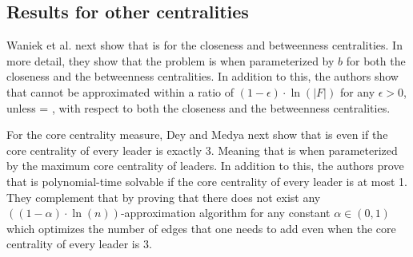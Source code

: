 \subsection{Results for other centralities}

Waniek et al. next show that \HL is \NPc for the closeness \cite{Waniek2017} and betweenness \cite{Waniek2021full} centralities.
In more detail, they show that the problem is \Wh when parameterized by $b$ for both the closeness and the betweenness centralities.
In addition to this, the authors show that \HL cannot be approximated within a ratio of $(1 - \epsilon ) \cdot \ln(|F|)$
for any $\epsilon > 0$, unless \Po = \NP, with respect to both the closeness and the betweenness centralities.

For the core centrality measure, Dey and Medya \cite{Dey2019} next show that \HLshort is \NPc even if the core centrality of
every leader is exactly 3. Meaning that \HLshort is \pNPh when parameterized by the maximum core centrality of leaders.
In addition to this, the authors prove that \HLshort is polynomial-time solvable
if the core centrality of every leader is at most 1.
They complement that by proving that there does not exist any $((1 - \alpha) \cdot \ln(n))$-approximation algorithm
for any constant $\alpha \in (0, 1)$ which optimizes the number of edges that one needs to add even
when the core centrality of every leader is 3.
 